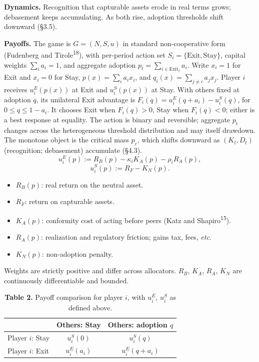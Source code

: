 \documentclass[12pt]{article}
\theoremstyle{definition}
\theoremstyle{remark}
\begin{document}
\smallskip
\noindent\textbf{Dynamics.} Recognition that capturable assets erode in real terms grows; debasement keeps accumulating. As both rise, adoption thresholds shift downward (\S3.5).

\smallskip
\noindent\textbf{Payoffs.} The game is $G = (N, S, u)$ in standard non-cooperative form (Fudenberg and Tirole\textsuperscript{18}), with per-period action set $S_i = \{\text{Exit}, \text{Stay}\}$, capital weights $\sum_i a_i = 1$, and aggregate adoption $p_t = \sum_{i \in \text{Exit}_t} a_i$. Write $x_i=1$ for Exit and $x_i=0$ for Stay, $p(x)=\sum_i a_i x_i$, and $q_i(x)=\sum_{j\ne i}a_jx_j$. Player $i$ receives $u_i^E(p(x))$ at Exit and $u_i^S(p(x))$ at Stay. With others fixed at adoption $q$, its unilateral Exit advantage is $F_i(q)=u_i^E(q+a_i)-u_i^S(q)$, for $0\le q\le1-a_i$. It chooses Exit when $F_i(q)>0$, Stay when $F_i(q)<0$; either is a best response at equality. The action is binary and reversible; aggregate $p_t$ changes across the heterogeneous threshold distribution and may itself drawdown. The monotone object is the critical mass $p_c$, which shifts downward as $(K_t,D_t)$ (recognition; debasement) accumulate (\S4.3).
\[
u_i^E(p) := R_B(p) - \kappa_i K_A(p) - \rho_i R_A(p),
\]
\[
u_i^S(p) := R_F - K_N(p).
\]

\begin{itemize}[nosep,leftmargin=*]
\item $R_B(p)$: real return on the neutral asset.
\item $R_F$: return on capturable assets.
\item $K_A(p)$: conformity cost of acting before peers (Katz and Shapiro\textsuperscript{15}).
\item $R_A(p)$: realization and regulatory friction; gains tax, fees, \textit{etc}.
\item $K_N(p)$: non-adoption penalty.
\end{itemize}

\smallskip
\noindent Weights are strictly positive and differ across allocators. $R_B$, $K_A$, $R_A$, $K_N$ are continuously differentiable and bounded.

\begin{table}[h]
\centering
\caption*{\textbf{Table 2.} Payoff comparison for player $i$, with $u_i^E$, $u_i^S$ as defined above.}
\begin{tabular}{lcc}
\toprule
 & Others: Stay & Others: adoption $q$ \\
\midrule
Player $i$: Stay & $u_i^S(0)$ & $u_i^S(q)$ \\
Player $i$: Exit & $u_i^E(a_i)$ & $u_i^E(q+a_i)$ \\
\bottomrule
\end{tabular}
\end{table}
\end{document}

